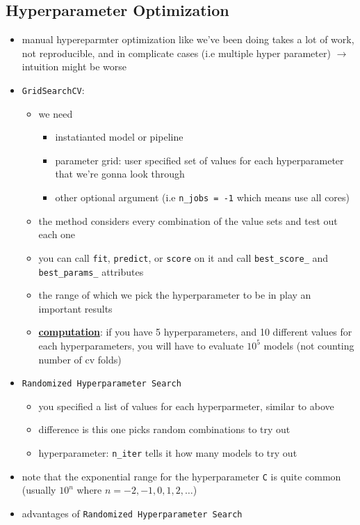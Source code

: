 \documentclass[10.5pt,a4paper, fleqn, dvipsnames]{article}
\begin{document}
\subsection*{Hyperparameter Optimization}
\begin{itemize}
    \item manual hypereparmter optimization like we've been doing takes a lot of work, not reproducible, and in complicate cases (i.e multiple hyper parameter) $\rightarrow$ intuition might be worse 
    \item \lstinline{GridSearchCV}: 
    \begin{itemize}
        \item we need
        \begin{itemize}[leftmargin = 2em]
            \item instatianted model or pipeline
            \item parameter grid: user specified set of values for each hyperparameter that we're gonna look through
            \item other optional argument (i.e \lstinline{n_jobs = -1} which means use all cores)
        \end{itemize}
        \item the method considers every combination of the value sets and test out each one 
        \item you can call \lstinline{fit}, \lstinline{predict}, or \lstinline{score} on it and call \lstinline{best_score_} and \lstinline{best_params_} attributes 
        \item the range of which we pick the hyperparameter to be in play an important results 
        \item \textbf{\ul{computation}}: if you have 5 hyperparameters, and 10 different values for each hyperparameters, you will have to evaluate $10^5$ models (not counting number of cv folds)
    \end{itemize}
    \item \lstinline{Randomized Hyperparameter Search}
    \begin{itemize}
        \item you specified a list of values for each hyperparmeter, similar to above
        \item difference is this one picks random combinations to try out
        \item hyperparameter: \lstinline{n_iter} tells it how many models to try out
    \end{itemize}
    \item note that the exponential range for the hyperparameter \lstinline{C} is quite common (usually $10^n$ where $n = -2, -1, 0, 1, 2, \ldots$)
    \item advantages of \lstinline{Randomized Hyperparameter Search}
\end{itemize}
\end{document}

